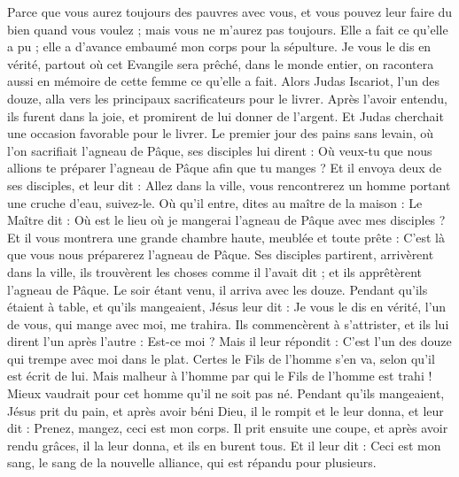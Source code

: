 \begin{multicols}{2}
Parce que vous aurez toujours des pauvres avec vous, et vous pouvez leur faire du bien quand vous voulez ; mais vous ne m'aurez pas toujours.
Elle a fait ce qu’elle a pu ; elle a d’avance embaumé mon corps pour la sépulture.
Je vous le dis en vérité, partout où cet Evangile sera prêché, dans le monde entier, on racontera aussi en mémoire de cette femme ce qu’elle a fait.
Alors Judas Iscariot, l'un des douze, alla vers les principaux sacrificateurs pour le livrer.
Après l’avoir entendu, ils furent dans la joie, et promirent de lui donner de l'argent. Et Judas cherchait une occasion favorable pour le livrer.
Le premier jour des pains sans levain, où l’on sacrifiait l'agneau de Pâque, ses disciples lui dirent : Où veux-tu que nous allions te préparer l'agneau de Pâque afin que tu manges ?
Et il envoya deux de ses disciples, et leur dit : Allez dans la ville, vous rencontrerez un homme portant une cruche d'eau, suivez-le.
Où qu’il entre, dites au maître de la maison : Le Maître dit : Où est le lieu où je mangerai l'agneau de Pâque avec mes disciples ?
Et il vous montrera une grande chambre haute, meublée et toute prête : C’est là que vous nous préparerez l'agneau de Pâque.
Ses disciples partirent, arrivèrent dans la ville, ils trouvèrent les choses comme il l’avait dit ; et ils apprêtèrent l'agneau de Pâque.
Le soir étant venu, il arriva avec les douze.
Pendant qu’ils étaient à table, et qu'ils mangeaient, Jésus leur dit : Je vous le dis en vérité, l'un de vous, qui mange avec moi, me trahira.
Ils commencèrent à s'attrister, et ils lui dirent l'un après l'autre : Est-ce moi ?
Mais il leur répondit : C'est l'un des douze qui trempe avec moi dans le plat.
Certes le Fils de l'homme s'en va, selon qu'il est écrit de lui. Mais malheur à l'homme par qui le Fils de l'homme est trahi ! Mieux vaudrait pour cet homme qu’il ne soit pas né.
Pendant qu’ils mangeaient, Jésus prit du pain, et après avoir béni Dieu, il le rompit et le leur donna, et leur dit : Prenez, mangez, ceci est mon corps.
Il prit ensuite une coupe, et après avoir rendu grâces, il la leur donna, et ils en burent tous.
Et il leur dit : Ceci est mon sang{}, le sang de la nouvelle alliance, qui est répandu pour plusieurs.

\end{multicols}
